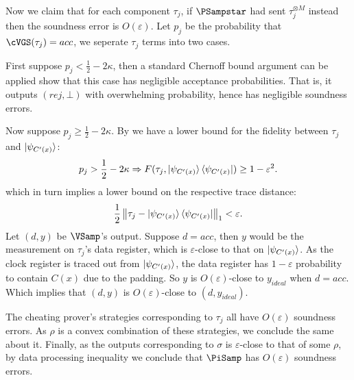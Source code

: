 \begin{prf}
	Now we claim that for each component $\tau_j$,
	if $\PSampstar$ had sent $\tau_j^{\otimes M}$ instead then the soundness error is $O(\varepsilon)$.
	Let $p_j$ be the probability that $\cVGS(\tau_j)=acc$, we seperate $\tau_j$ terms into two cases.

	First suppose $p_j<\frac{1}{2}-2\kappa$,
	then a standard Chernoff bound argument can be applied show that this case has negligible acceptance probabilities.
	That is, it outputs $(rej, \bot)$ with overwhelming probability, hence has negligible soundness errors.

	Now suppose $p_j\geq\frac{1}{2}-2\kappa$.
	By  we have a lower bound for the fidelity between $\tau_j$ and $\ket{\psi_{C'(x)}}$:
	$$p_j>\frac{1}{2}-2\kappa\Rightarrow F(\tau_j, \ket{\psi_{C'(x)}}\bra{\psi_{C'(x)}})\geq1-\varepsilon^2.$$
	which in turn implies a lower bound on the respective trace distance:
	$$\frac{1}{2}\left\lVert\tau_j - \ket{\psi_{C'(x)}}\bra{\psi_{C'(x)}}\right\rVert_1<\varepsilon.$$
	Let $(d, y)$ be $\VSamp$'s output. Suppose $d=acc$, then $y$ would be the measurement on $\tau_j$'s data register,
	which is $\varepsilon$-close to that on $\ket{\psi_{C'(x)}}$.
	As the clock register is traced out from $\ket{\psi_{C'(x)}}$, the data register has $1-\varepsilon$ probability to contain $C(x)$ due to the padding.
	So $y$ is $O(\varepsilon)$-close to $y_{ideal}$ when $d=acc$.
	Which implies that $(d, y)$ is $O(\varepsilon)$-close to $(d, y_{ideal})$.

	The cheating prover's strategies corresponding to $\tau_j$ all have $O(\varepsilon)$ soundness errors.
	As $\rho$ is a convex combination of these strategies, we conclude the same about it.
	Finally, as the outputs corresponding to $\sigma$ is $\varepsilon$-close to that of some $\rho$,
	by data processing inequality we conclude that $\PiSamp$ has $O(\varepsilon)$ soundness errors.
\end{prf}
